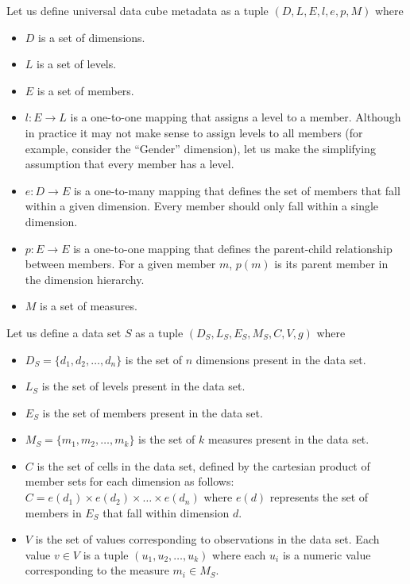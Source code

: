 \documentclass[12pt]{article}
\begin{document}
\begin{doublespace}
Let us define universal data cube metadata as a tuple $(D, L, E, l, e, p, M)$ where
\begin{itemize}
\item $D$ is a set of dimensions.
\item $L$ is a set of levels.
\item $E$ is a set of members.
\item $l:E \rightarrow L$ is a one-to-one mapping that assigns a level to a member. Although in practice it may not make sense to assign levels to all members (for example, consider the ``Gender'' dimension), let us make the simplifying assumption that every member has a level.
\item $e:D \rightarrow E$ is a one-to-many mapping that defines the set of members that fall within a given dimension. Every member should only fall within a single dimension.
\item $p:E \rightarrow E$ is a one-to-one mapping that defines the parent-child relationship between members. For a given member $m$, $p(m)$ is its parent member in the dimension hierarchy.
\item $M$ is a set of measures.
\end{itemize}

Let us define a data set $S$ as a tuple $(D_S, L_S, E_S, M_S, C, V, g)$ where
\begin{itemize}
\item $D_S = \{d_1, d_2, \ldots , d_n \}$ is the set of $n$ dimensions present in the data set.
\item $L_S$ is the set of levels present in the data set.
\item $E_S$ is the set of members present in the data set.
\item $M_S = \{m_1, m_2, \ldots , m_k \}$ is the set of $k$ measures present in the data set.
\item $C$ is the set of cells in the data set, defined by the cartesian product of member sets for each dimension as follows: $C = e(d_1) \times e(d_2) \times \ldots \times e(d_n)$ where $e(d)$ represents the set of members in $E_S$ that fall within dimension $d$. 
\item $V$ is the set of values corresponding to observations in the data set. Each value $v \in V$ is a tuple $(u_1, u_2, \ldots , u_k)$ where each $u_i$ is a numeric value corresponding to the measure $m_i \in M_S$.
\end{itemize}


\end{doublespace}
\end{document}
